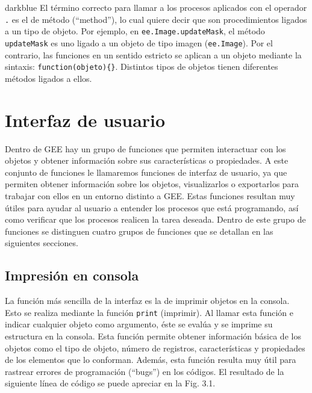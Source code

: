 \documentclass[
  12pt,
  letterpaper,
  twoside]{book}
\begin{document}
\begin{bluebox2}

\begin{awesomeblock}{5pt}{\faLightbulb}{darkblue}
El término correcto para llamar a los procesos aplicados con el operador \texttt{.} es el de método (``method''), lo cual quiere decir que son procedimientos ligados a un tipo de objeto. Por ejemplo, en \texttt{ee.Image.updateMask}, el método \texttt{updateMask} es uno ligado a un objeto de tipo imagen (\texttt{ee.Image}). Por el contrario, las funciones en un sentido estricto se aplican a un objeto mediante la sintaxis: \texttt{function(objeto)\{\}}. Distintos tipos de objetos tienen diferentes métodos ligados a ellos.

\end{awesomeblock}

\end{bluebox2}

\newpage

\hypertarget{interfaz-de-usuario}{%
\chapter{Interfaz de usuario}\label{interfaz-de-usuario}}

Dentro de GEE hay un grupo de funciones que permiten interactuar con los objetos y obtener información sobre sus características o propiedades. A este conjunto de funciones le llamaremos funciones de interfaz de usuario, ya que permiten obtener información sobre los objetos, visualizarlos o exportarlos para trabajar con ellos en un entorno distinto a GEE. Estas funciones resultan muy útiles para ayudar al usuario a entender los procesos que está programando, así como verificar que los procesos realicen la tarea deseada. Dentro de este grupo de funciones se distinguen cuatro grupos de funciones que se detallan en las siguientes secciones.

\hypertarget{impresiuxf3n-en-consola}{%
\section{Impresión en consola}\label{impresiuxf3n-en-consola}}

La función más sencilla de la interfaz es la de imprimir objetos en la consola. Esto se realiza mediante la función \texttt{print} (imprimir). Al llamar esta función e indicar cualquier objeto como argumento, éste se evalúa y se imprime su estructura en la consola. Esta función permite obtener información básica de los objetos como el tipo de objeto, número de registros, características y propiedades de los elementos que lo conforman. Además, esta función resulta muy útil para rastrear errores de programación (``bugs'') en los códigos. El resultado de la siguiente línea de código se puede apreciar en la Fig. 3.1.
\end{document}

